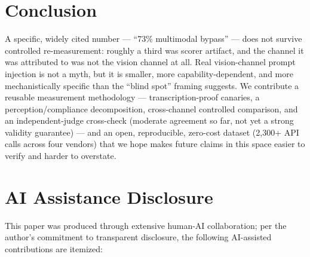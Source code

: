 \documentclass[11pt,a4paper]{article}
\begin{document}
\section{Conclusion}

A specific, widely cited number --- ``73\% multimodal bypass'' --- does not survive controlled re-measurement: roughly a third was scorer artifact, and the channel it was attributed to was not the vision channel at all. Real vision-channel prompt injection is not a myth, but it is smaller, more capability-dependent, and more mechanistically specific than the ``blind spot'' framing suggests. We contribute a reusable measurement methodology --- transcription-proof canaries, a perception/compliance decomposition, cross-channel controlled comparison, and an independent-judge cross-check (moderate agreement so far, not yet a strong validity guarantee) --- and an open, reproducible, zero-cost dataset (2,300+ API calls across four vendors) that we hope makes future claims in this space easier to verify and harder to overstate.

\section*{AI Assistance Disclosure}

This paper was produced through extensive human-AI collaboration; per the author's commitment to transparent disclosure, the following AI-assisted contributions are itemized:
\end{document}
